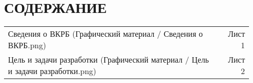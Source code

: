 \newsection
\section*{СОДЕРЖАНИЕ}
\tableofcontents
\vspace{3pt}
{\parindent0pt
\begin{tabular}{@{}p{0.85\linewidth}r{0.124\linewidth}}
Сведения о ВКРБ (Графический материал / Сведения о ВКРБ.png) & Лист 1\\
Цель и задачи разработки (Графический материал / Цель
и задачи разработки.png) & Лист 2\\
\end{tabular}
}

